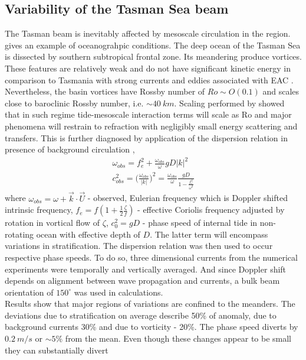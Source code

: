\documentclass[12pt]{article}
\begin{document}
\subsection{Variability of the Tasman Sea beam}
The Tasman beam is inevitably affected by mesoscale circulation in the region. 
 gives an example of oceanograhpic conditions. The 
deep ocean of the Tasman Sea is dissected by southern subtropical frontal zone. Its meandering 
produce vortices. These features are relatively weak and do not have significant kinetic energy in 
comparison to Tasmania with strong currents and eddies associated with EAC 
\citep{zhao2018satellite}. Nevertheless, the basin vortices have Rossby number of $Ro \sim O(0.1)$ 
and scales close to baroclinic Rossby number, i.e. $\sim 40~km$. Scaling performed by 
\citep{dunphy2017low} showed that in such regime tide-mesoscale interaction terms will scale as Ro 
and major phenomena will restrain to refraction with negligibly small energy scattering and 
transfers. This is further diagnosed by application of the dispersion relation in presence of 
background circulation \citep{zaron2014time},
\begin{align}
\omega_{obs} = f_e^2 + \frac{\omega_{obs}}{\omega} gD |k|^2\\
c_{obs}^2 = \big( \frac{\omega_{obs}}{|k|} \big)^2 = \frac{\omega_{obs}}{\omega} \frac{gD}{1 - 
\frac{f_e^2}{\omega^2}}
\end{align}
where $\omega_{obs} = \omega + \vec{k}\cdot \vec{U}$ - observed, Eulerian frequency which is 
Doppler shifted intrinsic frequency, $f_e = f(1 + \frac{1}{2} \frac{\zeta}{f})$ - effective 
Coriolis frequency adjusted by rotation in vortical flow of $\zeta$, $c_0^2 = gD$ - phase speed of 
internal tide in non-rotating ocean with effective depth of $D$. The latter term will encompass 
variations in stratification. The dispersion relation was then used to occur respective phase 
speeds. To do so, three dimensional currents from the numerical experiments were temporally and 
vertically averaged. And since Doppler shift depends on alignment between wave propagation and 
currents, a bulk beam orientation of $150^\circ$ was used in calculations.\\
Results  show that major regions of variations are confined to the 
meanders. The deviations due to stratification on average describe 50\% of anomaly, due to 
background currents 30\% and due to vorticity - 20\%. The phase speed diverts by $0.2~m/s$ or 
$\sim5\%$ from the mean. Even though these changes appear to be small they can substantially divert 
\end{document}
